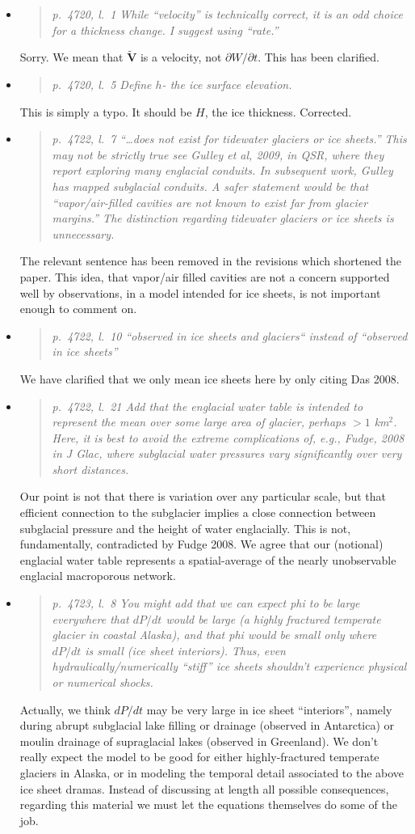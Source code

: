 \documentclass[11pt,reqno]{amsart}
\newcommand{\reply}[2]{
\medskip\medskip
\item  \begin{quote}
\emph{#1}
\end{quote}

\medskip
\noindent #2}
\begin{document}
\begin{itemize}
\reply{p.~4720, l.~1  While ``velocity'' is technically correct, it is an odd choice for a thickness change. I suggest using ``rate.''}
{Sorry.  We mean that $\tilde{\mathbf{V}}$ is a velocity, not $\partial W/\partial t$.  This has been clarified.}

\reply{p.~4720, l.~5 Define $h$- the ice surface elevation.}
{This is simply a typo.  It should be $H$, the ice thickness.  Corrected.}

\reply{p.~4722, l.~7 ``\dots does not exist for tidewater glaciers or ice sheets.'' This may not be strictly true see Gulley et al, 2009, in QSR, where they report exploring many englacial conduits.  In subsequent work, Gulley has mapped subglacial conduits.  A safer statement would be that ``vapor/air-filled cavities are not known to exist far from glacier margins.''  The distinction regarding tidewater glaciers or ice sheets is unnecessary.}
{The relevant sentence has been removed in the revisions which shortened the paper.  This idea, that vapor/air filled cavities are not a concern supported well by observations, in a model intended for ice sheets, is not important enough to comment on.}

\reply{p.~4722, l.~10 ``observed in ice sheets and glaciers`` instead of ``observed in ice sheets''}
{We have clarified that we only mean ice sheets here by only citing Das 2008.}

\reply{p.~4722, l.~21 Add that the englacial water table is intended to represent the mean
over some large area of glacier, perhaps $>1$ km$^2$. Here, it is best to avoid the extreme
complications of, e.g., Fudge, 2008 in J Glac, where subglacial water pressures vary
significantly over very short distances.}
{Our point is not that there is variation over any particular scale, but that efficient connection to the subglacier implies a close connection between subglacial pressure and the height of water englacially.  This is not, fundamentally, contradicted by Fudge 2008.  We agree that our (notional) englacial water table represents a spatial-average of the nearly unobservable englacial macroporous network.}

\reply{p.~4723, l.~8 You might add that we can expect phi to be large everywhere that $dP/dt$ would be large (a highly fractured temperate glacier in coastal Alaska), and that phi would be small only where $dP/dt$ is small (ice sheet interiors). Thus, even hydraulically/numerically ``stiff'' ice sheets shouldn’t experience physical or numerical shocks.}
{Actually, we think $dP/dt$ may be very large in ice sheet ``interiors'', namely during abrupt subglacial lake filling or drainage (observed in Antarctica) or moulin drainage of supraglacial lakes (observed in Greenland).  We don't really expect the model to be good for either highly-fractured temperate glaciers in Alaska, or in modeling the temporal detail associated to the above ice sheet dramas.  Instead of discussing at length all possible consequences, regarding this material we must let the equations themselves do some of the job.}


\end{itemize}
\end{document}
